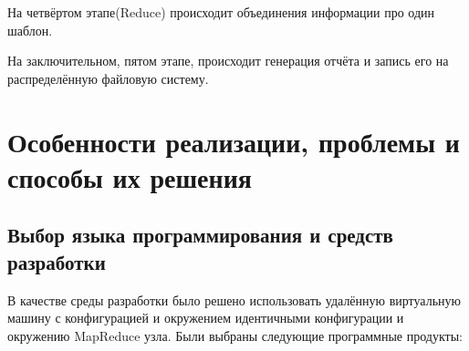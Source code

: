 На четвёртом этапе(Reduce) происходит объединения информации про один шаблон.

На заключительном, пятом этапе, происходит генерация отчёта и запись его на
распределённую файловую систему.

\section{Особенности реализации, проблемы и способы их решения}

\subsection{Выбор языка программирования и средств разработки}
В качестве среды разработки было решено использовать удалённую виртуальную
машину с конфигурацией и окружением идентичными конфигурации и окружению
MapReduce узла. Были выбраны следующие программные продукты:

